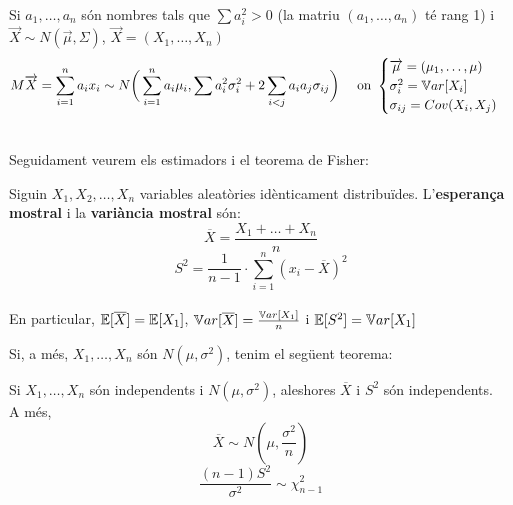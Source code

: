 \begin{col}
  Si $a_{1},\ldots,a_{n}$ són nombres tals que $\sum a_{i}^2 > 0$ (la matriu $(a_{1},\ldots,a_{n})$ té rang 1) 
  i $\overrightarrow{X}\sim N(\overrightarrow{\mu}, \Sigma)$, $\overrightarrow{X} = (X_{1},\ldots,X_{n})$
  \[
    M\overrightarrow{X} = \sum_{i=1}^{n} a_{i}x_{i} \sim N\bigg(\sum_{i=1}^{n} a_{i}\mu_{i}, 
    \sum a_{i}^{2}\sigma_{i}^{2} + 2\sum_{i<j}a_{i}a_{j}\sigma_{ij}\bigg) \quad \text{ on } 
    \begin{cases}
      \overrightarrow{\mu} = (\mu_{1},\ldots,\mu) \\
      \sigma_{i}^{2} = \mathbb{V} ar[X_{i}] \\
      \sigma_{ij} = Cov(X_{i}, X_{j})
    \end{cases}
  \]
\end{col}

\-\\
Seguidament veurem els estimadors i el teorema de Fisher:

\begin{defi}
  Siguin $X_{1}, X_{2}, \ldots, X_{n}$ variables aleatòries idènticament distribuïdes. 
  L'\textbf{esperança mostral} i la \textbf{variància mostral} són: \\
  \[
    \overline{X} = \frac{X_{1}+\ldots+X_{n}}{n}
  \]
  \[
    S^{2} = \frac{1}{n-1}\cdot\sum_{i=1}^{n}(x_{i} - \overline{X})^{2}
  \]
  \-\\
  En particular, $\mathbb{E}[\overline{X}] = \mathbb{E}[X_{1}]$, $\mathbb{V} ar[\overline{X}] = \frac{\mathbb{V} ar[X_{1}]}{n}$ i $\mathbb{E}[S^{2}] = \mathbb{V} ar[X_{1}]$ \\
  
\end{defi}

Si, a més, $X_{1},\ldots,X_{n}$ són $N(\mu,\sigma^{2})$, tenim el següent teorema:

\begin{thm}[(Fisher)]
  Si $X_{1},\ldots, X_{n}$ són independents i $N(\mu, \sigma^{2})$, aleshores $\overline{X}$ i $S^{2}$ són independents. \\ 
  A més, $$\overline{X} \sim N(\mu, \frac{\sigma^{2}}{n})$$ $$\frac{(n-1)S^{2}}{\sigma^2} \sim \chi_{n-1}^{2}$$
\end{thm}
